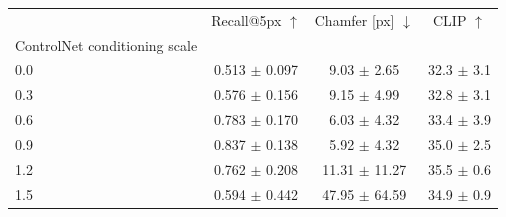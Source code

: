 \begin{tabular}{lccc}
\toprule
 & Recall@5px $\uparrow$ & Chamfer [px] $\downarrow$ & CLIP $\uparrow$ \\
ControlNet conditioning scale &  &  &  \\
\midrule
0.0 & 0.513 $\pm$ 0.097 & 9.03 $\pm$ 2.65 & 32.3 $\pm$ 3.1 \\
0.3 & 0.576 $\pm$ 0.156 & 9.15 $\pm$ 4.99 & 32.8 $\pm$ 3.1 \\
0.6 & 0.783 $\pm$ 0.170 & 6.03 $\pm$ 4.32 & 33.4 $\pm$ 3.9 \\
0.9 & 0.837 $\pm$ 0.138 & 5.92 $\pm$ 4.32 & 35.0 $\pm$ 2.5 \\
1.2 & 0.762 $\pm$ 0.208 & 11.31 $\pm$ 11.27 & 35.5 $\pm$ 0.6 \\
1.5 & 0.594 $\pm$ 0.442 & 47.95 $\pm$ 64.59 & 34.9 $\pm$ 0.9 \\
\bottomrule
\end{tabular}
